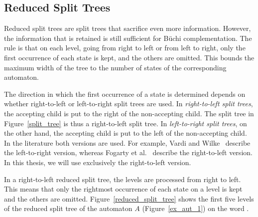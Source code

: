 


\subsection{Reduced Split Trees}
\label{2_red_split_trees}
Reduced split trees are split trees that sacrifice even more information. However, the information that is retained is still sufficient for Büchi complementation. The rule is that on each level, going from right to left or from left to right, only the first occurrence of each state is kept, and the others are omitted. This bounds the maximum width of the tree to the number of states of the corresponding automaton.

The direction in which the first occurrence of a state is determined depends on whether right-to-left or left-to-right split trees are used. In \textit{right-to-left split trees}, the accepting child is put to the right of the non-accepting child. The split tree in Figure~\ref{split_tree} is thus a right-to-left split tree. In \textit{left-to-right split trees}, on the other hand, the accepting child is put to the left of the non-accepting child. In the literature both versions are used. For example, Vardi and Wilke~\cite{vardi2007automata} describe the left-to-right version, whereas Fogarty et al.~\cite{fogarty2013unifying} describe the right-to-left version. In this thesis, we will use exclusively the right-to-left version.

In a right-to-left reduced split tree, the levels are processed from right to left. This means that only the rightmost occurrence of each state on a level is kept and the others are omitted. Figure~\ref{reduced_split_tree} shows the first five levels of the reduced split tree of the automaton $A$ (Figure~\ref{ex_aut_1}) on the word \aom.

